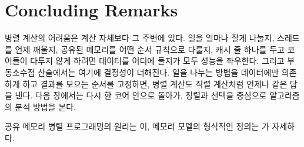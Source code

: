 \section{Concluding Remarks}

병렬 계산의 어려움은 계산 자체보다 그 주변에 있다. 일을 얼마나 잘게 나눌지, 스레드를 언제 깨울지, 공유된 메모리를 어떤 순서 규칙으로 다룰지, 캐시 줄 하나를 두고 코어들이 다투지 않게 하려면 데이터를 어디에 둘지가 모두 성능을 좌우한다. 그리고 부동소수점 산술에서는 여기에 결정성이 더해진다. 일을 나누는 방법을 데이터에만 의존하게 하고 결과를 모으는 순서를 고정하면, 병렬 계산도 직렬 계산처럼 언제나 같은 답을 낸다. 다음 장에서는 다시 한 코어 안으로 돌아가, 정렬과 선택을 중심으로 알고리즘의 분석 방법을 본다.

공유 메모리 병렬 프로그래밍의 원리는 \cite{herlihy2020}이, 메모리 모델의 형식적인 정의는 \cite{boehm2008cpp}가 자세하다.

\chapterreferences
